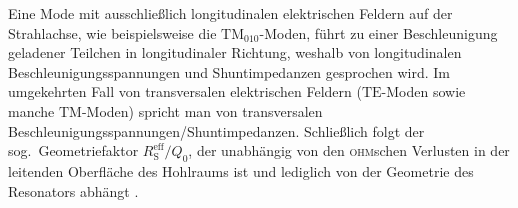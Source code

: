 Eine Mode mit ausschließlich longitudinalen elektrischen Feldern auf der Strahlachse, wie beispielsweise die $\mathrm{TM}_{010}$-Moden, führt zu einer Beschleunigung geladener Teilchen in longitudinaler Richtung, weshalb von longitudinalen Beschleunigungsspannungen und Shuntimpedanzen gesprochen wird.
Im umgekehrten Fall von transversalen elektrischen Feldern ($\mathrm{TE}$-Moden sowie manche $\mathrm{TM}$-Moden) spricht man von transversalen Beschleunigungsspannungen/Shuntimpedanzen.
Schließlich folgt der sog.\ Geometriefaktor $R_\mathrm{S}^\mathrm{eff} / Q_0$, der unabhängig von den \textsc{ohm}schen Verlusten in der leitenden Oberfläche des Hohlraums ist und lediglich von der Geometrie des Resonators abhängt \cite{wangler}.
